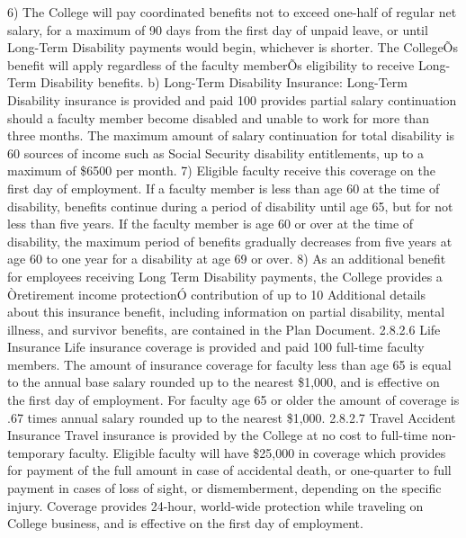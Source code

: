 \documentclass[letterpaper, 11pt]{article}
\begin{document}
	6) The College will pay coordinated benefits not to exceed one-half of regular net salary, for a maximum of 90 days from the first day of unpaid leave, or until Long-Term Disability payments would begin, whichever is shorter.  The CollegeÕs benefit will apply regardless of the faculty memberÕs eligibility to receive Long-Term Disability benefits.
	b) Long-Term Disability Insurance:  Long-Term Disability insurance is provided
	and paid 100%
	provides partial salary continuation should a faculty member become disabled and
	unable to work for more than three months.  The maximum amount of salary
	continuation for total disability is 60%
	sources of income such as Social Security disability entitlements, up to a
	maximum of \$6500 per month.
	7) Eligible faculty receive this coverage on the first day of employment.  If a faculty member is less than age 60 at the time of disability, benefits continue during a period of disability until age 65, but for not less than five years.  If the faculty member is age 60 or over at the time of disability, the maximum period of benefits gradually decreases from five years at age 60 to one year for a disability at age 69 or over.
	8) As an additional benefit for employees receiving Long Term Disability payments, the College provides a Òretirement income protectionÓ contribution of up to 10%
	Additional details about this insurance benefit, including information on partial disability, mental illness, and survivor benefits, are contained in the Plan Document.
	2.8.2.6 Life Insurance
	Life insurance coverage is provided and paid 100%
	full-time faculty members.  The amount of insurance coverage for faculty less
	than age 65 is equal to the annual base salary rounded up to the nearest
	\$1,000, and is effective on the first day of employment.  For faculty age 65
	or older the amount of coverage is .67 times annual salary rounded up to the
	nearest \$1,000.
	2.8.2.7 Travel Accident Insurance
	Travel insurance is provided by the College at no cost to full-time
	non-temporary faculty.  Eligible faculty will have \$25,000 in coverage which provides for payment of the full amount in case of accidental death, or one-quarter to full payment in cases of loss of sight, or dismemberment, depending on the specific injury.  Coverage provides 24-hour, world-wide protection while traveling on College business, and is effective on the first day of employment.
\end{document}
